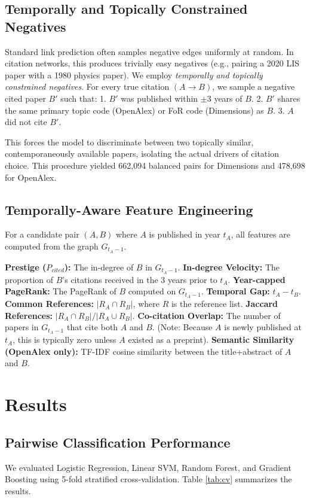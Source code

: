 \documentclass[11pt,a4paper]{article}
\begin{document}
\subsection{Temporally and Topically Constrained Negatives}
Standard link prediction often samples negative edges uniformly at random. In citation networks, this produces trivially easy negatives (e.g., pairing a 2020 LIS paper with a 1980 physics paper). We employ \textit{temporally and topically constrained negatives}. For every true citation $(A \to B)$, we sample a negative cited paper $B'$ such that:
1. $B'$ was published within $\pm 3$ years of $B$.
2. $B'$ shares the same primary topic code (OpenAlex) or FoR code (Dimensions) as $B$.
3. $A$ did not cite $B'$.

This forces the model to discriminate between two topically similar, contemporaneously available papers, isolating the actual drivers of citation choice. This procedure yielded 662,094 balanced pairs for Dimensions and 478,698 for OpenAlex.

\subsection{Temporally-Aware Feature Engineering}
For a candidate pair $(A, B)$ where $A$ is published in year $t_A$, all features are computed from the graph $G_{t_A-1}$.

\textbf{Prestige ($P_{cited}$):} The in-degree of $B$ in $G_{t_A-1}$.
\textbf{In-degree Velocity:} The proportion of $B$'s citations received in the 3 years prior to $t_A$.
\textbf{Year-capped PageRank:} The PageRank of $B$ computed on $G_{t_A-1}$.
\textbf{Temporal Gap:} $t_A - t_B$.
\textbf{Common References:} $|R_A \cap R_B|$, where $R$ is the reference list.
\textbf{Jaccard References:} $|R_A \cap R_B| / |R_A \cup R_B|$.
\textbf{Co-citation Overlap:} The number of papers in $G_{t_A-1}$ that cite both $A$ and $B$. (Note: Because $A$ is newly published at $t_A$, this is typically zero unless $A$ existed as a preprint).
\textbf{Semantic Similarity (OpenAlex only):} TF-IDF cosine similarity between the title+abstract of $A$ and $B$.

\section{Results}
\label{sec:results}

\subsection{Pairwise Classification Performance}
We evaluated Logistic Regression, Linear SVM, Random Forest, and Gradient Boosting using 5-fold stratified cross-validation. Table \ref{tab:cv} summarizes the results.
\end{document}
